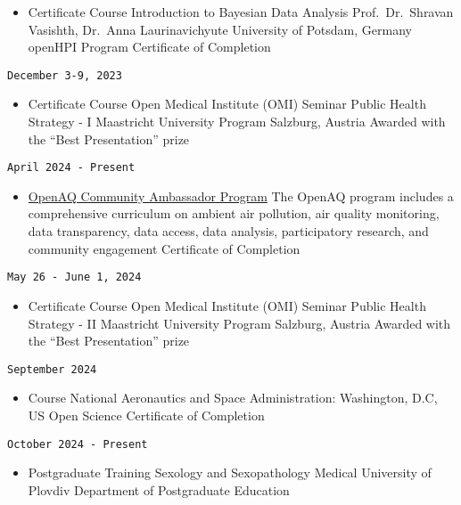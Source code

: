 \documentclass[
  12pt,
  letterpaper,
  DIV=11,
  numbers=noendperiod]{scrartcl}
\providecommand{\tightlist}{%
  \setlength{\itemsep}{0pt}\setlength{\parskip}{0pt}}\usepackage{longtable,booktabs,array}
\begin{document}
\begin{itemize}
\tightlist
\item
  Certificate Course \textbar{} Introduction to Bayesian Data Analysis
  \textbar{} Prof.~Dr.~Shravan Vasishth, Dr.~Anna Laurinavichyute
  \textbar{} University of Potsdam, Germany \textbar{} openHPI Program
  \textbar{} Certificate of Completion
\end{itemize}

\texttt{December\ 3-9,\ 2023}

\begin{itemize}
\tightlist
\item
  Certificate Course \textbar{} Open Medical Institute (OMI) Seminar
  \textbar{} Public Health Strategy - I \textbar{} Maastricht University
  Program \textbar{} Salzburg, Austria \textbar{} Awarded with the
  ``Best Presentation'' prize
\end{itemize}

\texttt{April\ 2024\ -\ Present}

\begin{itemize}
\tightlist
\item
  \href{https://openaq.org/about/people/kostadin-kostadinov/}{OpenAQ
  Community Ambassador Program} \textbar{} The OpenAQ program includes a
  comprehensive curriculum on ambient air pollution, air quality
  monitoring, data transparency, data access, data analysis,
  participatory research, and community engagement \textbar{}
  Certificate of Completion
\end{itemize}

\texttt{May\ 26\ -\ June\ 1,\ 2024}

\begin{itemize}
\tightlist
\item
  Certificate Course \textbar{} Open Medical Institute (OMI) Seminar
  \textbar{} Public Health Strategy - II \textbar{} Maastricht
  University Program \textbar{} Salzburg, Austria \textbar{} Awarded
  with the ``Best Presentation'' prize
\end{itemize}

\texttt{September\ 2024}

\begin{itemize}
\tightlist
\item
  Course \textbar{} National Aeronautics and Space Administration:
  Washington, D.C, US \textbar{} Open Science \textbar{} Certificate of
  Completion
\end{itemize}

\texttt{October\ 2024\ -\ Present}

\begin{itemize}
\tightlist
\item
  Postgraduate Training \textbar{} Sexology and Sexopathology \textbar{}
  Medical University of Plovdiv \textbar{} Department of Postgraduate
  Education
\end{itemize}
\end{document}
